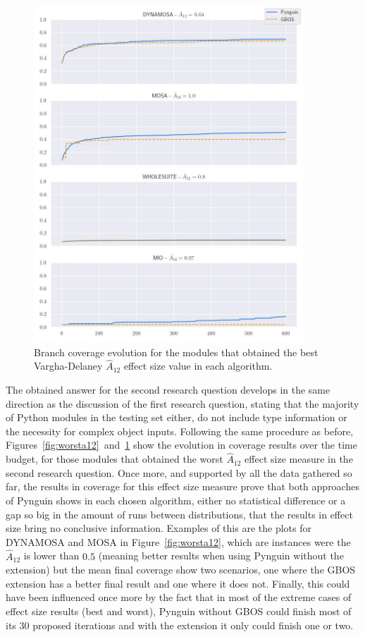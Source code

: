 \documentclass[%
  chapterprefix=false,%
  open=right,%
  twoside=true,%
  paper=a4,%
  logofile={Figures/logo.png},%
  thesistype=master,%
  UKenglish,%
]{se2thesis}
\begin{document}
\begin{figure}[ht]
  \centering
  \includegraphics[width=0.9\textwidth]{Figures/Results/bestA12.jpg}
  \caption{Branch coverage evolution for the modules that obtained the best Vargha-Delaney \(\hat{A}_{12}\) effect size value in each algorithm.}\label{fig:besta12}
\end{figure}

The obtained answer for the second research question develops in the same direction as the discussion of the first research question, stating that the majority of Python modules in the testing set either, do not include type information or the necessity for complex object inputs.
Following the same procedure as before, Figures~\ref{fig:worsta12}~and~\ref{fig:besta12} show the evolution in coverage results over the time budget, for those modules that obtained the worst \(\hat{A}_{12}\) effect size measure in the second research question.
Once more, and supported by all the data gathered so far, the results in coverage for this effect size measure prove that both approaches of Pynguin shows in each chosen algorithm, either no statistical difference or a gap so big in the amount of runs between distributions, that the results in effect size bring no conclusive information.
Examples of this are the plots for DYNAMOSA and MOSA in Figure~\ref{fig:worsta12}, which are instances were the \(\hat{A}_{12}\) is lower than \(0.5\) (meaning better results when using Pynguin without the extension) but the mean final coverage show two scenarios, one where the GBOS extension has a better final result and one where it does not.
Finally, this could have been influenced once more by the fact that in most of the extreme cases of effect size results (best and worst), Pynguin without GBOS could finish most of its 30 proposed iterations and with the extension it only could finish one or two. 
\end{document}

